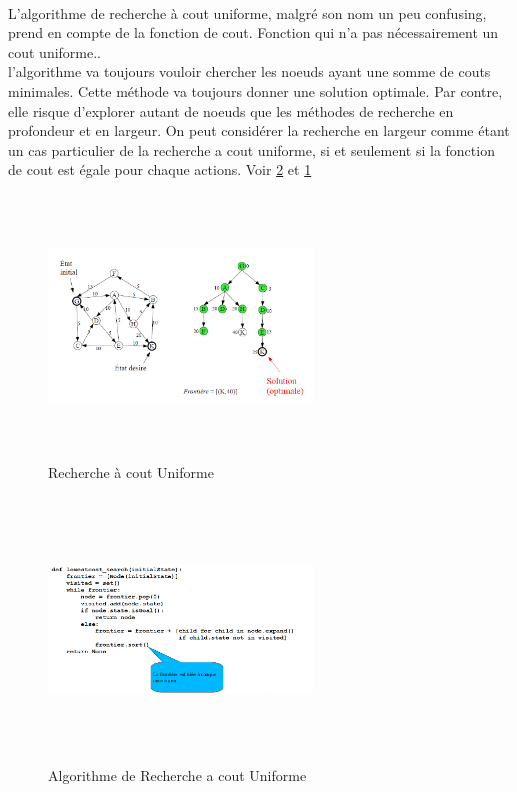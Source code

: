 \documentclass{book}
\begin{document}
\paragraph{}
L'algorithme de recherche à cout uniforme, malgré son nom un peu confusing, prend en compte de la fonction de cout. Fonction qui n'a pas nécessairement un cout uniforme.. \\

l'algorithme va toujours vouloir chercher les noeuds ayant une somme de couts minimales. Cette méthode va toujours donner une solution optimale. Par contre, elle risque d'explorer autant de noeuds que les méthodes de recherche en profondeur et en largeur. On peut considérer la recherche en largeur comme étant un cas particulier de la recherche a cout uniforme, si et seulement si la fonction de cout est égale pour chaque actions. Voir \ref{fig:Algo_Recherche_Uniforme} et \ref{fig:Recherche_Uniforme}

\begin{figure}[!ht]
\centering
\includegraphics[width = 7cm, height = 7cm, keepaspectratio]{Recherche_Uniforme.png}
\caption{Recherche à cout Uniforme}
\label{fig:Recherche_Uniforme}
\end{figure}

\begin{figure}[!ht]
\centering
\includegraphics[width = 7cm, height = 7cm, keepaspectratio]{algo_uniforme.png}
\caption{Algorithme de Recherche a cout Uniforme}
\label{fig:Algo_Recherche_Uniforme}
\end{figure}
\end{document}
